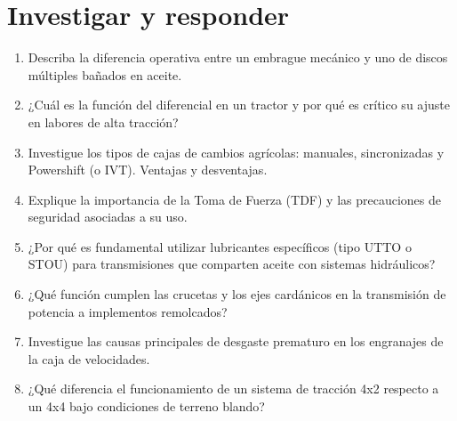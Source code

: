 \section*{\faPencil\space Investigar y responder}
\begin{enumerate}
	\item Describa la diferencia operativa entre un embrague mecánico y uno de discos
	      múltiples bañados en aceite.
	\item ¿Cuál es la función del diferencial en un tractor y por qué es crítico su
	      ajuste en labores de alta tracción?
	\item Investigue los tipos de cajas de cambios agrícolas: manuales, sincronizadas
	      y Powershift (o IVT). Ventajas y desventajas.
	\item Explique la importancia de la Toma de Fuerza (TDF) y las precauciones de
	      seguridad asociadas a su uso.
	\item ¿Por qué es fundamental utilizar lubricantes específicos (tipo UTTO o
	      STOU) para transmisiones que comparten aceite con sistemas hidráulicos?
	\item ¿Qué función cumplen las crucetas y los ejes cardánicos en la transmisión
	      de potencia a implementos remolcados?
	\item Investigue las causas principales de desgaste prematuro en los engranajes
	      de la caja de velocidades.
	\item ¿Qué diferencia el funcionamiento de un sistema de tracción 4x2 respecto a
	      un 4x4 bajo condiciones de terreno blando?
\end{enumerate}

